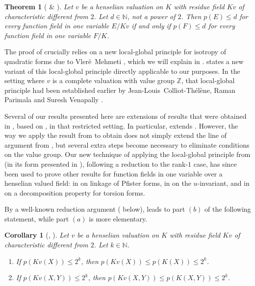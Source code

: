 \documentclass[12pt,leqno]{amsart}
\newcommand{\nat}{\mathbb{N}}
\newcommand{\zz}{\mathbb Z}
\renewcommand{\leq}{\leqslant}
\numberwithin{equation}{section}
\newtheorem{thm}[equation]{Theorem}
\newtheorem{cor}[equation]{Corollary}
\theoremstyle{definition}
\theoremstyle{plain}
\begin{document}
\begin{thm}[ \& ]\label{T:main}
Let $v$ be a henselian valuation on $K$ with residue field $Kv$ of characteristic different from $2$.
Let $d\in\nat$, not a power of $2$.
Then $p(E) \leq d$ for every function field in one variable $E/Kv$ if and only if
 $p(F) \leq d$ for every function field in one variable $F/K$.
\end{thm}
The proof of  crucially relies on a new local-global principle for isotropy of quadratic forms due to Vler\"e~Mehmeti \cite{Meh19}, which we will explain in . 
 states a new variant of this local-global principle directly applicable to our purposes.
In the setting where $v$ is a complete valuation with value group $\zz$, that local-global principle had been established earlier by Jean-Louis~Colliot-Thélène, Raman Parimala and Suresh Venapally \cite{CTPS12}.

Several of our results presented here are extensions of results that were obtained in \cite{BGVG14}, based on \cite{CTPS12}, in that restricted setting.
In particular,  extends \cite[Theorem 6.8]{BGVG14}.
However, the way we apply the result from \cite{Meh19} to obtain  does not simply extend the line of argument from \cite{BGVG14}, but several extra steps become necessary to eliminate conditions on the value group.
Our new technique of applying the local-global principle  from \cite{Meh19} (in its form presented in ), following a reduction to the rank-$1$ case, has since been used to prove other results for function fields in one variable over a henselian valued field: in \cite{Daa24} on linkage of Pfister forms, in \cite{BDM25} on the $u$-invariant, and in \cite{AB26} on a decomposition property for torsion forms.

By a well-known reduction argument ( below),   leads to part $(b)$ of the following statement, while part $(a)$ is more elementary.

\begin{cor}[, ]\label{MT}
    Let $v$ be a henselian valuation on $K$ with residue field $Kv$ of characteristic different from $2$. Let $k\in\nat$.
\begin{enumerate}[$(a)$]
    \item If $p(Kv(X))\leq 2^k$, then $p(Kv(X))\leq p(K(X))\leq 2^k$.
    \item If $p(Kv(X,Y))\leq 2^k$, then $p(Kv(X,Y))\leq p(K(X,Y))\leq 2^k$.
\end{enumerate} 
\end{cor}
\end{document}
